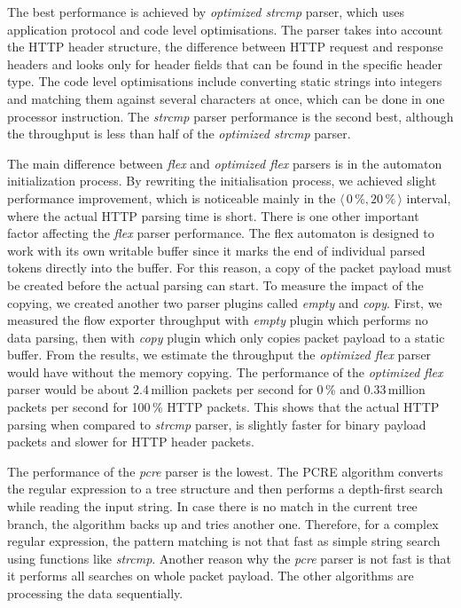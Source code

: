 The best performance is achieved by \emph{optimized strcmp} parser, which uses application protocol and code level optimisations. The parser takes into account the HTTP header structure, the difference between HTTP request and response headers and looks only for header fields that can be found in the specific header type. The code level optimisations include converting static strings into integers and matching them against several characters at once, which can be done in one processor instruction. The \emph{strcmp} parser performance is the second best, although the throughput is less than half of the \emph{optimized strcmp} parser.

The main difference between \emph{flex} and \emph{optimized flex} parsers is in the automaton initialization process. By rewriting the initialisation process, we achieved slight performance improvement, which is noticeable mainly in the $\langle\,0\,\%,20\,\%\,\rangle$ interval, where the actual HTTP parsing time is short. There is one other important factor affecting the \emph{flex} parser performance. The flex automaton is designed to work with its own writable buffer since it marks the end of individual parsed tokens directly into the buffer. For this reason, a copy of the packet payload must be created before the actual parsing can start. To measure the impact of the copying, we created another two parser plugins called \emph{empty} and \emph{copy}. First, we measured the flow exporter throughput with \emph{empty} plugin which performs no data parsing, then with \emph{copy} plugin which only copies packet payload to a static buffer. From the results, we estimate the throughput the \emph{optimized flex} parser would have without the memory copying. The performance of the \emph{optimized flex} parser would be about 2.4\,million packets per second for 0\,\% and 0.33\,million packets per second for 100\,\% HTTP packets. This shows that the actual HTTP parsing when compared to \emph{strcmp} parser, is slightly faster for binary payload packets and slower for HTTP header packets.

The performance of the \emph{pcre} parser is the lowest. The PCRE algorithm converts the regular expression to a tree structure and then performs a depth-first search while reading the input string. In case there is no match in the current tree branch, the algorithm backs up and tries another one. Therefore, for a complex regular expression, the pattern matching is not that fast as simple string search using functions like \emph{strcmp}. Another reason why the \emph{pcre} parser is not fast is that it performs all searches on whole packet payload. The other algorithms are processing the data sequentially.

